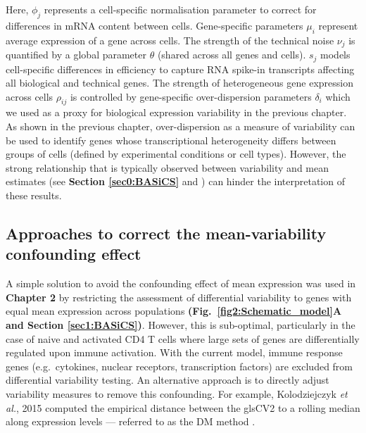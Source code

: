 Here, $\phi_j$ represents a cell-specific normalisation parameter to correct for differences in mRNA content between cells. Gene-specific parameters $\mu_i$ represent average expression of a gene across cells. The strength of the technical noise $\nu_j$ is quantified by a global parameter $\theta$ (shared across all genes and cells). $s_j$ models cell-specific differences in efficiency to capture RNA spike-in transcripts affecting all biological and technical genes. The strength of heterogeneous gene expression across cells $\rho_{ij}$ is controlled by gene-specific over-dispersion parameters $\delta_i$ which we used as a proxy for biological expression variability in the previous chapter. As shown in the previous chapter, over-dispersion as a measure of variability can be used to identify genes whose transcriptional heterogeneity differs between groups of cells (defined by experimental conditions or cell types). However, the strong relationship that is typically observed between variability and mean estimates (see \textbf{Section \ref{sec0:BASiCS}} and \citep{Brennecke2013}) can hinder the interpretation of these results. 

\newpage

\subsection{Approaches to correct the mean-variability confounding effect}

A simple solution to avoid the confounding effect of mean expression was used in \textbf{Chapter 2} by restricting the assessment of differential variability to genes with equal mean expression across populations \textbf{(Fig.~\ref{fig2:Schematic_model}A and Section \ref{sec1:BASiCS})}. However, this is sub-optimal, particularly in the case of naive and activated CD4\plus{} T cells where large sets of genes are differentially regulated upon immune activation. With the current model, immune response genes (e.g.~cytokines, nuclear receptors, transcription factors) are excluded from differential variability testing. An alternative approach is to directly adjust variability measures to remove this confounding. For example, Kolodziejczyk \emph{et al.}, 2015 computed the empirical distance between the gls{CV2} to a rolling median along expression levels --- referred to as the DM method \citep{Newman2006, Kolodziejczyk2015cell}.  \\

